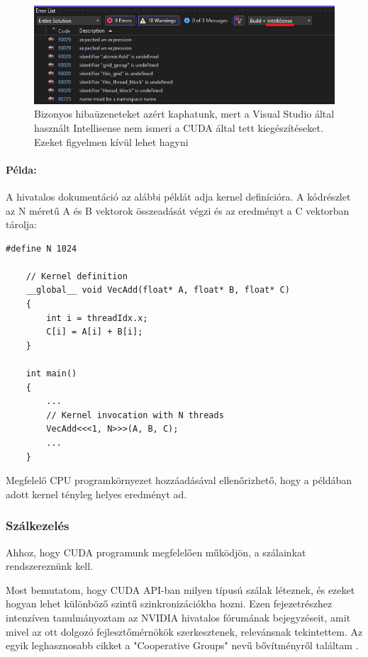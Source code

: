 
\begin{figure}[ht!]
	\centering
	\includegraphics[width=150mm, keepaspectratio] {figures/invalidIntellisenseErrorMessages.png}
	\caption{Bizonyos hibaüzeneteket azért kaphatunk, mert a Visual Studio által használt Intellisense nem ismeri a CUDA által tett kiegészítéseket. Ezeket figyelmen kívül lehet hagyni \label{invalidErrors} }
\end{figure}

\paragraph{Példa:} A hivatalos dokumentáció az alábbi példát adja kernel definícióra. A kódrészlet az N méretű A és B vektorok összeadását végzi és az eredményt a C vektorban tárolja:

\begin{lstlisting}[style=CStyle]
	#define N 1024
	
	// Kernel definition
	__global__ void VecAdd(float* A, float* B, float* C)
	{
		int i = threadIdx.x;
		C[i] = A[i] + B[i];
	}
	
	int main()
	{
		...
		// Kernel invocation with N threads
		VecAdd<<<1, N>>>(A, B, C);
		...
	}
\end{lstlisting}

Megfelelő CPU programkörnyezet hozzáadásával ellenőrizhető, hogy a példában adott kernel tényleg helyes eredményt ad.

\subsubsection{Szálkezelés}
Ahhoz, hogy CUDA programunk megfelelően működjön, a szálainkat rendszereznünk kell. 

Most bemutatom, hogy CUDA API-ban milyen típusú szálak léteznek, és ezeket hogyan lehet különböző szintű szinkronizációkba hozni. Ezen fejezetrészhez intenzíven tanulmányoztam az NVIDIA hivatalos fórumának bejegyzéseit, amit mivel az ott dolgozó fejlesztőmérnökök szerkesztenek, relevánsnak tekintettem. Az egyik leghasznosabb cikket a "Cooperative Groups" nevű bővítményről találtam \cite{CUDAcoopgroups}.

